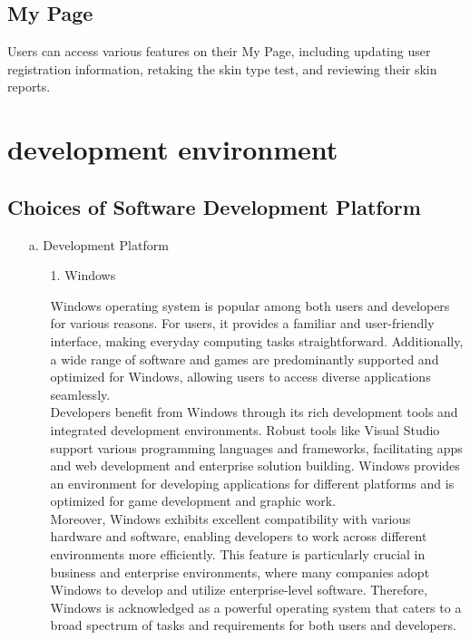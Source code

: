 \documentclass[conference]{IEEEtran}
\begin{document}
\subsection{My Page}
Users can access various features on their My Page, including updating user registration information, retaking the skin type test, and reviewing their skin reports.\\

\section{development environment}
\subsection{Choices of Software Development Platform}
\begin{enumerate}
    \item[a.] Development Platform
    
    \begin{enumerate}
    \item[1.] Windows \cite{novac2017comparative} \cite{stallings2005windows}
    \item[] Windows operating system is popular among both users and developers for various reasons. For users, it provides a familiar and user-friendly interface, making everyday computing tasks straightforward. Additionally, a wide range of software and games are predominantly supported and optimized for Windows, allowing users to access diverse applications seamlessly.
    \\
    Developers benefit from Windows through its rich development tools and integrated development environments. Robust tools like Visual Studio support various programming languages and frameworks, facilitating apps and web development and enterprise solution building. Windows provides an environment for developing applications for different platforms and is optimized for game development and graphic work.
    \\
    Moreover, Windows exhibits excellent compatibility with various hardware and software, enabling developers to work across different environments more efficiently. This feature is particularly crucial in business and enterprise environments, where many companies adopt Windows to develop and utilize enterprise-level software. Therefore, Windows is acknowledged as a powerful operating system that caters to a broad spectrum of tasks and requirements for both users and developers. \\


\end{enumerate}
\end{enumerate}
\end{document}
